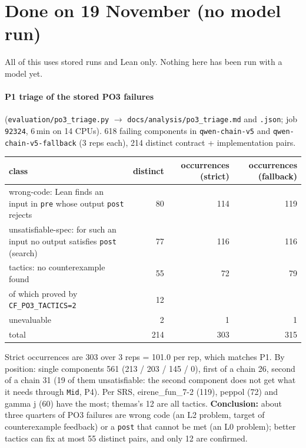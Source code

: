 \documentclass[11pt,a4paper]{article}
\newcommand{\code}[1]{\texttt{#1}}
\newcommand{\file}[1]{\texttt{#1}}
\begin{document}
\tableofcontents

\section{Done on 19 November (no model run)}\label{sec:nov19}

All of this uses stored runs and Lean only. Nothing here has been run with a model yet.

\paragraph{P1 triage of the stored PO3 failures} (\file{evaluation/po3\_triage.py} $\to$
\file{docs/analysis/po3\_triage.md} and \file{.json}; job \code{92324}, 6\,min on 14 CPUs).
618 failing components in \file{qwen-chain-v5} and \file{qwen-chain-v5-fallback} (3 reps each),
214 distinct contract + implementation pairs.

\begin{center}
\begin{tabular}{lrrr}
\toprule
class & distinct & occurrences (strict) & occurrences (fallback) \\
\midrule
wrong-code: Lean finds an input in \code{pre} whose output \code{post} rejects & 80 & 114 & 119 \\
unsatisfiable-spec: for such an input no output satisfies \code{post} (search) & 77 & 116 & 116 \\
tactics: no counterexample found & 55 & 72 & 79 \\
\quad of which proved by \code{CF\_PO3\_TACTICS=2} & 12 & & \\
unevaluable & 2 & 1 & 1 \\
\midrule
total & 214 & 303 & 315 \\
\bottomrule
\end{tabular}
\end{center}

\noindent Strict occurrences are 303 over 3 reps = 101.0 per rep, which matches P1. By position: single
components 561 (213 / 203 / 145 / 0), first of a chain 26, second of a chain 31 (19 of them
unsatisfiable: the second component does not get what it needs through \code{Mid}, P4). Per SRS,
eirene\_fun\_7-2 (119), peppol (72) and gamma j (60) have the most; themas's 12 are all tactics.
\textbf{Conclusion:} about three quarters of PO3 failures are wrong code (an L2 problem, target of
counterexample feedback) or a \code{post} that cannot be met (an L0 problem); better tactics can fix
at most 55 distinct pairs, and only 12 are confirmed.
\end{document}
